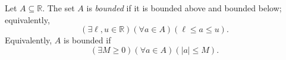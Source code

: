 \begin{definition}
\label{def:bounded}
Let $A\subseteq\mathbb{R}$. The set $A$ is \emph{bounded} if it is bounded
above and bounded below; equivalently,
\[
  (\exists \ell,u\in\mathbb{R})(\forall a\in A)(\ell\leq a\leq u).
\]
Equivalently, $A$ is bounded if
\[
  (\exists M\geq 0)(\forall a\in A)(|a|\leq M).
\]
\end{definition}